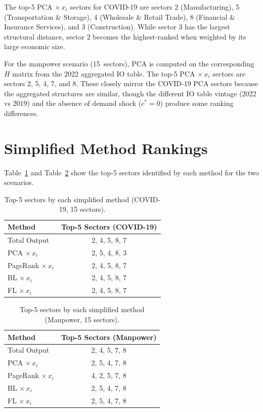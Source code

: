 The top-5 PCA $\times\, x_i$ sectors for COVID-19 are sectors 2 (Manufacturing), 5 (Transportation \& Storage), 4 (Wholesale \& Retail Trade), 8 (Financial \& Insurance Services), and 3 (Construction). While sector 3 has the largest structural distance, sector 2 becomes the highest-ranked when weighted by its large economic size.

For the manpower scenario (15~sectors), PCA is computed on the corresponding $H$ matrix from the 2022 aggregated IO table. The top-5 PCA $\times\, x_i$ sectors are sectors 2, 5, 4, 7, and 8. These closely mirror the COVID-19 PCA sectors because the aggregated structures are similar, though the different IO table vintage (2022 vs 2019) and the absence of demand shock ($c^* = 0$) produce some ranking differences.


\section{Simplified Method Rankings}

Table~\ref{tab:rankings-covid} and Table~\ref{tab:rankings-manpower} show the top-5 sectors identified by each method for the two scenarios.

\begin{table}[H]
\centering
\begin{tabular}{@{}lc@{}}
\toprule
\textbf{Method} & \textbf{Top-5 Sectors (COVID-19)} \\
\midrule
Total Output           & 2, 4, 5, 8, 7 \\
PCA $\times\, x_i$        & 2, 5, 4, 8, 3 \\
PageRank $\times\, x_i$   & 2, 4, 5, 8, 7 \\
BL $\times\, x_i$         & 2, 4, 5, 8, 7 \\
FL $\times\, x_i$         & 2, 4, 5, 8, 7 \\
\bottomrule
\end{tabular}
\caption{Top-5 sectors by each simplified method (COVID-19, 15 sectors).}
\label{tab:rankings-covid}
\end{table}

\begin{table}[H]
\centering
\begin{tabular}{@{}lc@{}}
\toprule
\textbf{Method} & \textbf{Top-5 Sectors (Manpower)} \\
\midrule
Total Output           & 2, 4, 5, 7, 8 \\
PCA $\times\, x_i$        & 2, 5, 4, 7, 8 \\
PageRank $\times\, x_i$   & 4, 2, 5, 7, 8 \\
BL $\times\, x_i$         & 2, 5, 4, 7, 8 \\
FL $\times\, x_i$         & 2, 5, 4, 7, 8 \\
\bottomrule
\end{tabular}
\caption{Top-5 sectors by each simplified method (Manpower, 15 sectors).}
\label{tab:rankings-manpower}
\end{table}

